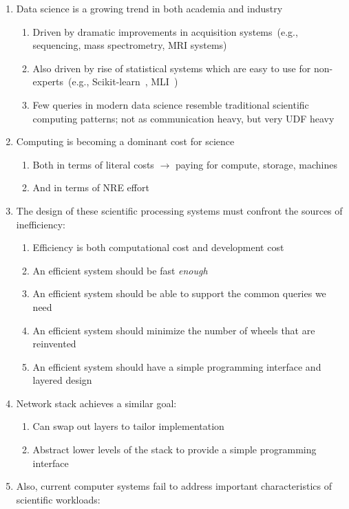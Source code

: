 \documentclass{acm_proc_article-sp}
\begin{document}
\begin{enumerate}
\item Data science is a growing trend in both academia and industry
\begin{enumerate}
\item Driven by dramatic improvements in acquisition systems~(e.g., sequencing, mass spectrometry,
MRI systems)
\item Also driven by rise of statistical systems which are easy to use for non-experts~(e.g.,
Scikit-learn~\cite{pedregosa11}, MLI~\cite{sparks13})
\item Few queries in modern data science resemble traditional scientific computing patterns; not as
communication heavy, but very UDF heavy
\end{enumerate}
\item Computing is becoming a dominant cost for science
\begin{enumerate}
\item Both in terms of literal costs $\rightarrow$ paying for compute, storage, machines~\cite{stein10,
schadt10}
\item And in terms of NRE effort~\cite{wilson14}
\end{enumerate}
\item The design of these scientific processing systems must confront the sources of inefficiency:
\begin{enumerate}
\item Efficiency is both computational cost and development cost
\item An efficient system should be fast \emph{enough}
\item An efficient system should be able to support the common queries we need
\item An efficient system should minimize the number of wheels that are reinvented
\item An efficient system should have a simple programming interface and layered design~\cite{bafna13}
\end{enumerate}
\item Network stack achieves a similar goal:
\begin{enumerate}
\item Can swap out layers to tailor implementation
\item Abstract lower levels of the stack to provide a simple programming interface
\end{enumerate}
\item Also, current computer systems fail to address important characteristics of scientific workloads:

\end{enumerate}
\end{document}
